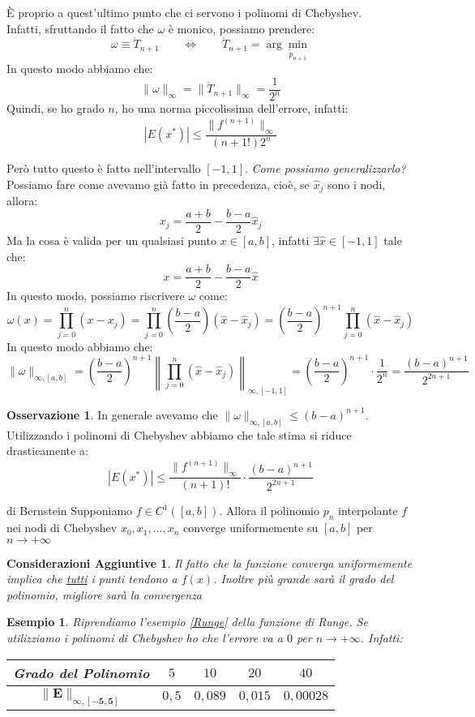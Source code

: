 \documentclass[11pt,a4paper,twoside]{article}
\newtheorem{es}{Esempio}
\newtheorem*{cons}{Considerazioni Aggiuntive}
\theoremstyle{definition}
\newtheorem*{oss}{Osservazione}
\begin{document}
È proprio a quest'ultimo punto che ci servono i polinomi di Chebyshev.\\
Infatti, sfruttando il fatto che $\omega$ è monico, possiamo prendere:
\[ \omega \equiv \mathring T_{n+1}\qquad \Leftrightarrow \qquad \mathring T_{n+1} = \arg \min_{\mathring p_{n+1}} \]
In questo modo abbiamo che:
\[ \|\omega\|_\infty = \|\mathring T_{n+1}\|_\infty = \frac 1{2^n} \]
Quindi, se ho grado $n$, ho una norma piccolissima dell'errore, infatti:
\[ |E(x^*)| \leq \frac{\|f^{(n+1)}\|_\infty}{(n+1!)2^n}\]

Però tutto questo è fatto nell'intervallo $[-1,1]$. \textit{Come possiamo generalizzarlo?}\\
Possiamo fare come avevamo già fatto in precedenza, cioè, se $\hat x_j$ sono i nodi, allora:
\[ x_j = \frac{a+b}2 - \frac{b-a}2 \hat x_j \]
Ma la cosa è valida per un qualsiasi punto $x \in [a,b]$, infatti $\exists \hat x \in [-1,1]$ tale che:
\[ x = \frac{a+b}2 - \frac{b-a}2 \hat x \]
In questo modo, possiamo riscrivere $\omega$ come:
\[ \omega(x) = \prod_{j = 0}^n(x-x_j) = \prod_{j =0}^n \left( \frac{b-a}2 \right)(\hat x-\hat x_j) = \left(\frac{b-a}2\right)^{n+1} \prod_{j = 0}^n(\hat x- \hat x_j)\]
In questo modo abbiamo che:
\[ \|\omega\|_{\infty,[a,b]} = \left(\frac{b-a}2\right)^{n+1} \left\| \prod_{j = 0}^n (\hat x - \hat x_j) \right\|_{\infty, [-1,1]} = \left(\frac{b-a}2\right)^{n+1} \cdot \frac 1{2^n} = \frac{(b-a)^{n+1}}{2^{2n+1}}\]

\begin{oss}
	In generale avevamo che $\|\omega\|_{\infty, [a,b]} \leq(b-a)^{n+1}$. Utilizzando i polinomi di Chebyshev abbiamo che tale stima si riduce drasticamente a:
	\[ |E(x^*)|\leq \frac{\|f^{(n+1)}\|_\infty}{(n+1)!}\cdot \frac{(b-a)^{n+1}}{2^{2n+1}} \]
\end{oss}

\begin{thm}{di Bernstein}{}
	Supponiamo $f \in C^1([a,b])$. Allora il polinomio $p_n$ interpolante $f$ nei nodi di Chebyshev $x_0,x_1,...,x_n$ converge uniformemente su $[a,b]$ per $n \to + \infty$
\end{thm}

\begin{cons}
	Il fatto che la funzione converga uniformemente implica che \underline{tutti} i punti tendono a $f(x)$. Inoltre più grande sarà il grado del polinomio, migliore sarà la convergenza
\end{cons}

\begin{es}
	Riprendiamo l'esempio \ref{Runge} della funzione di Runge. Se utilizziamo i polinomi di Chebyshev ho che l'errore va a $0$ per $n \to + \infty$. Infatti:

	\begin{center}
		\begin{tabular}{c|c|c|c|c}
			\textbf{Grado del Polinomio} & $5$ & $10$ & $20$ & $40$\\
			\hline
			$\mathbf{\|E\|_{\infty, [-5,5]}}$ & $0,5$ & $0,089$ & $0,015$ & $0,00028$
		\end{tabular}
	\end{center}
\end{es}
\end{document}
